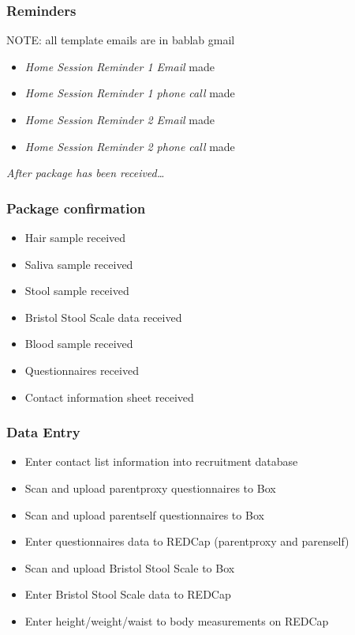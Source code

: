 \documentclass[]{book}
\providecommand{\tightlist}{%
  \setlength{\itemsep}{0pt}\setlength{\parskip}{0pt}}
\begin{document}
\hypertarget{reminders-4}{%
\subsubsection{Reminders}\label{reminders-4}}

NOTE: all template emails are in bablab gmail

\begin{itemize}
\tightlist
\item
  \emph{Home Session Reminder 1 Email} made
\item
  \emph{Home Session Reminder 1 phone call} made
\item
  \emph{Home Session Reminder 2 Email} made
\item
  \emph{Home Session Reminder 2 phone call} made
\end{itemize}

\emph{After package has been received\ldots{}}

\hypertarget{package-confirmation-1}{%
\subsubsection{Package confirmation}\label{package-confirmation-1}}

\begin{itemize}
\tightlist
\item
  Hair sample received
\item
  Saliva sample received
\item
  Stool sample received
\item
  Bristol Stool Scale data received
\item
  Blood sample received
\item
  Questionnaires received
\item
  Contact information sheet received
\end{itemize}

\hypertarget{data-entry-5}{%
\subsubsection{Data Entry}\label{data-entry-5}}

\begin{itemize}
\tightlist
\item
  Enter contact list information into recruitment database
\item
  Scan and upload parentproxy questionnaires to Box
\item
  Scan and upload parentself questionnaires to Box
\item
  Enter questionnaires data to REDCap (parentproxy and parenself)
\item
  Scan and upload Bristol Stool Scale to Box
\item
  Enter Bristol Stool Scale data to REDCap
\item
  Enter height/weight/waist to body measurements on REDCap
\end{itemize}
\end{document}
